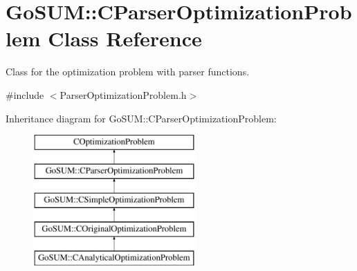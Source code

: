\hypertarget{class_go_s_u_m_1_1_c_parser_optimization_problem}{\section{Go\-S\-U\-M\-:\-:C\-Parser\-Optimization\-Problem Class Reference}
\label{class_go_s_u_m_1_1_c_parser_optimization_problem}
}


Class for the optimization problem with parser functions.  




{\ttfamily \#include $<$Parser\-Optimization\-Problem.\-h$>$}

Inheritance diagram for Go\-S\-U\-M\-:\-:C\-Parser\-Optimization\-Problem\-:\begin{figure}[H]
\begin{center}
\leavevmode
\includegraphics[height=5.000000cm]{class_go_s_u_m_1_1_c_parser_optimization_problem}
\end{center}
\end{figure}
